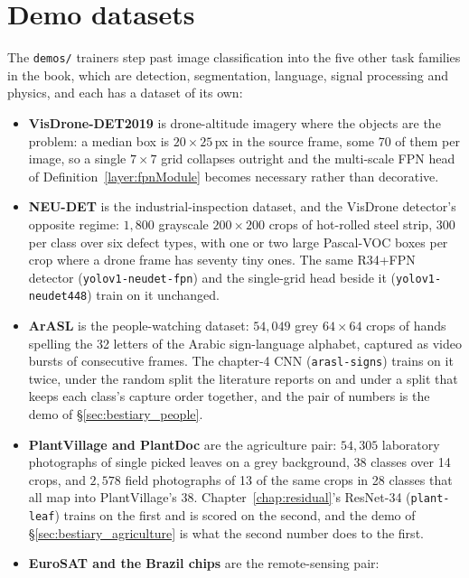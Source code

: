 \section*{Demo datasets}

The \texttt{demos/} trainers step
past image classification into the five other task families in the book,
which are detection, segmentation, language, signal processing and
physics, and each has a dataset of its own:

\begin{itemize}
  \item \textbf{VisDrone-DET2019} is drone-altitude imagery where the
    objects are the problem: a median box is $20 \times 25$\,px in the source frame, some 70
    of them per image, so a single $7\times7$ grid collapses outright and
    the multi-scale FPN head of Definition~\ref{layer:fpnModule} becomes
    necessary rather than decorative.
  \item \textbf{NEU-DET} is the industrial-inspection dataset, and the
    VisDrone detector's opposite regime: $1{,}800$ grayscale $200\times200$
    crops of hot-rolled steel strip, $300$ per class over six defect types,
    with one or two large Pascal-VOC boxes per crop where a drone frame has
    seventy tiny ones. The same R34+FPN detector (\texttt{yolov1-neudet-fpn})
    and the single-grid head beside it (\texttt{yolov1-neudet448}) train on
    it unchanged.
  \item \textbf{ArASL} is the people-watching dataset: $54{,}049$ grey
    $64\times64$ crops of hands spelling the 32 letters of the Arabic
    sign-language alphabet, captured as video bursts of consecutive frames.
    The chapter-4 CNN (\texttt{arasl-signs}) trains on it twice, under the
    random split the literature reports on and under a split that keeps each
    class's capture order together, and the pair of numbers is the demo of
    \S\ref{sec:bestiary_people}.
  \item \textbf{PlantVillage and PlantDoc} are the agriculture pair: $54{,}305$
    laboratory photographs of single picked leaves on a grey background, 38
    classes over 14 crops, and $2{,}578$ field photographs of 13 of the same
    crops in 28 classes that all map into PlantVillage's 38. Chapter~\ref{chap:residual}'s
    ResNet-34 (\texttt{plant-leaf}) trains on the first and is scored on the
    second, and the demo of \S\ref{sec:bestiary_agriculture} is what the
    second number does to the first.
  \item \textbf{EuroSAT and the Brazil chips} are the remote-sensing pair:

\end{itemize}
